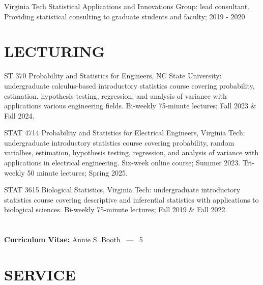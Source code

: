 \documentclass[margin,line,11pt]{res}
\begin{document}
\begin{resume}
{\sc Virginia Tech Statistical Applications and Innovations Group}: lead consultant.  Providing statistical consulting to graduate students and faculty; 2019 - 2020


\medskip
\section{LECTURING}

{\sc ST 370 Probability and Statistics for Engineers, NC State University}: undergraduate calculus-based introductory statistics course covering probability, estimation, hypothesis testing, regression, and analysis of variance with applications various engineering fields. Bi-weekly 75-minute lectures; Fall 2023 \& Fall 2024.

{\sc STAT 4714 Probability and Statistics for Electrical Engineers, Virginia Tech}: undergraduate introductory statistics course covering probability, random varialbes, estimation, hypothesis testing, regression, and analysis of variance with applications in electrical engineering. Six-week online course; Summer 2023. Tri-weekly 50 minute lectures; Spring 2025.

{\sc STAT 3615 Biological Statistics, Virginia Tech}: undergraduate introductory statistics course covering descriptive and inferential statistics with applications to biological sciences. Bi-weekly 75-minute lectures; Fall 2019 \& Fall 2022.



\pagebreak
\section{}
\hfill {\bf Curriculum Vitae:} Annie S. Booth \  --- \  5
\medskip
\section{\bf SERVICE}


\end{resume}
\end{document}
